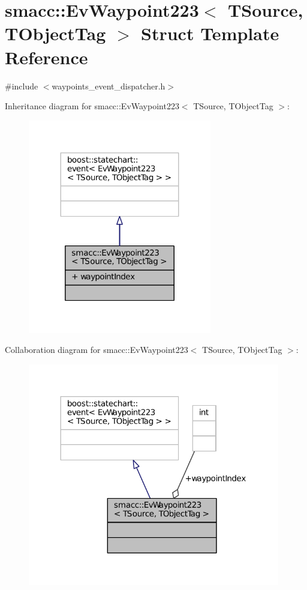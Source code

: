 \hypertarget{structsmacc_1_1EvWaypoint223}{}\section{smacc\+:\+:Ev\+Waypoint223$<$ T\+Source, T\+Object\+Tag $>$ Struct Template Reference}
\label{structsmacc_1_1EvWaypoint223}


{\ttfamily \#include $<$waypoints\+\_\+event\+\_\+dispatcher.\+h$>$}



Inheritance diagram for smacc\+:\+:Ev\+Waypoint223$<$ T\+Source, T\+Object\+Tag $>$\+:
\nopagebreak
\begin{figure}[H]
\begin{center}
\leavevmode
\includegraphics[width=227pt]{structsmacc_1_1EvWaypoint223__inherit__graph}
\end{center}
\end{figure}


Collaboration diagram for smacc\+:\+:Ev\+Waypoint223$<$ T\+Source, T\+Object\+Tag $>$\+:
\nopagebreak
\begin{figure}[H]
\begin{center}
\leavevmode
\includegraphics[width=312pt]{structsmacc_1_1EvWaypoint223__coll__graph}
\end{center}
\end{figure}
